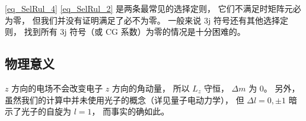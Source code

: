\autoref{eq_SelRul_4} \autoref{eq_SelRul_2} 是两条最常见的选择定则， 它们不满足时矩阵元必为零， 但我们并没有证明满足了必不为零。 一般来说 3j 符号还有其他选择定则， 找到所有 3j 符号（或 CG 系数）为零的情况是十分困难的。

\subsection{物理意义}
$z$ 方向的电场不会改变电子 $z$ 方向的角动量， 所以 $L_z$ 守恒， $\Delta m$ 为 0。 另外， 虽然我们的计算中并未使用光子的概念（详见量子电动力学）， 但 $\Delta l = 0, \pm 1$ 暗示了光子的自旋为 $l=1$， 而事实的确如此。

